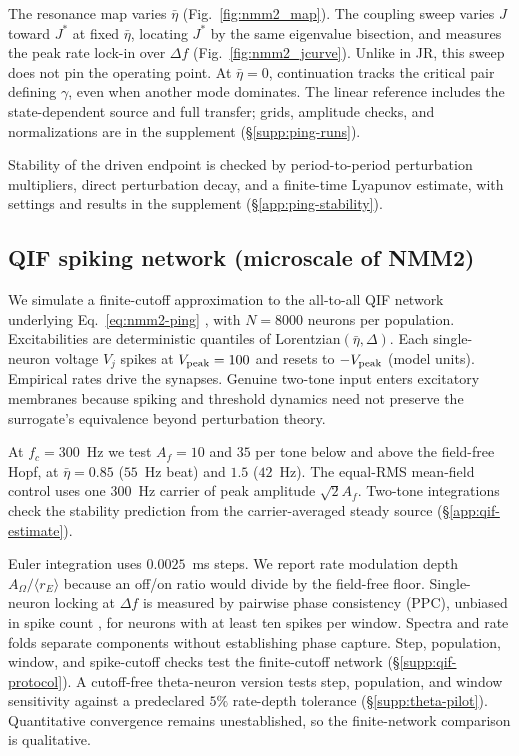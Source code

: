 \documentclass[a4paper]{article}
\newif\ifjne
\begin{document}
The resonance map varies $\bar\eta$ (Fig.~\ref{fig:nmm2_map}). The coupling sweep varies
$J$ toward $J^*$ at fixed $\bar\eta$, locating $J^*$ by the same eigenvalue bisection,
and measures the peak rate lock-in over $\Delta f$ (Fig.~\ref{fig:nmm2_jcurve}). Unlike
in JR, this sweep does not pin the operating point. At $\bar\eta=0$, continuation tracks
the critical pair defining $\gamma$, even when another mode dominates. The linear
reference includes the state-dependent source and full transfer; grids, amplitude
checks, and normalizations are in the supplement (\S\ref{supp:ping-runs}).

\ifjne\else

\fi

Stability of the driven endpoint is checked by period-to-period perturbation
multipliers, direct perturbation decay, and a finite-time Lyapunov estimate, with
settings and results in the supplement (\S\ref{app:ping-stability}).

\subsection{QIF spiking network (microscale of NMM2)}\label{sec:qif-methods}
We simulate a finite-cutoff approximation to the all-to-all QIF network underlying
Eq.~\eqref{eq:nmm2-ping} \cite{montbrio2015,ruffini2025rosetta,clusella2023},
with $N=8000$ neurons per population. Excitabilities are
deterministic quantiles of Lorentzian$(\bar\eta,\Delta)$. Each single-neuron voltage $V_j$ spikes at $V_{\rm peak}=100$
and resets to $-V_{\rm peak}$ (model units). Empirical rates drive the synapses. Genuine
two-tone input enters excitatory membranes because spiking and threshold dynamics need
not preserve the surrogate's equivalence beyond perturbation theory.

At $f_c=300$~Hz we test $A_f=10$ and $35$ per tone below and above the
field-free Hopf, at $\bar\eta=0.85$ ($55$~Hz beat) and $1.5$ ($42$~Hz).
The equal-RMS mean-field control uses one $300$~Hz carrier of peak amplitude
$\sqrt2 A_f$. Two-tone integrations check the stability prediction from the
carrier-averaged steady source (\S\ref{app:qif-estimate}).

Euler integration uses $0.0025$~ms steps. We report rate modulation depth
$A_\Omega/\langle r_E\rangle$ because an off/on ratio would divide by the field-free
floor. Single-neuron locking at $\Delta f$ is measured by pairwise phase consistency
(PPC), unbiased in spike count \cite{vinck2010}, for neurons with at least ten
spikes per window.
Spectra and rate folds separate components without establishing phase capture.
Step, population, window, and spike-cutoff checks test the finite-cutoff network
(\S\ref{supp:qif-protocol}). A cutoff-free theta-neuron version tests step,
population, and window sensitivity against a predeclared $5\%$ rate-depth
tolerance (\S\ref{supp:theta-pilot}).
Quantitative convergence remains unestablished, so the finite-network
comparison is qualitative.
\end{document}

